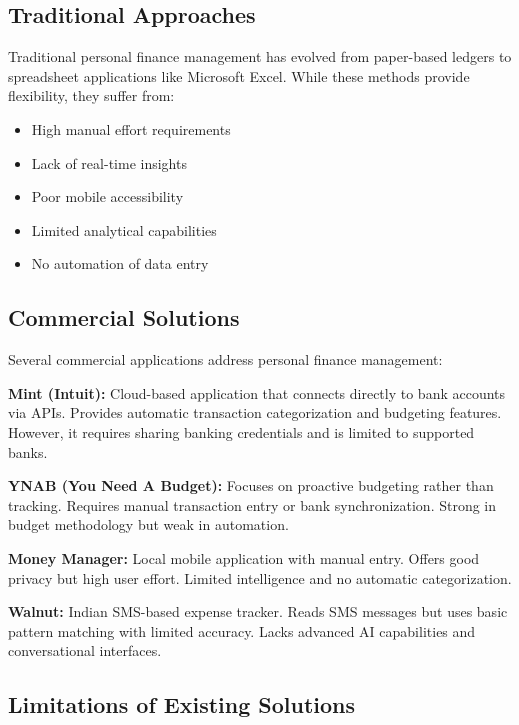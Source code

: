 \documentclass[11pt,a4paper]{report}
\begin{document}
\subsection{Traditional Approaches}

Traditional personal finance management has evolved from paper-based ledgers to spreadsheet applications like Microsoft Excel. While these methods provide flexibility, they suffer from:

\begin{itemize}
    \item High manual effort requirements
    \item Lack of real-time insights
    \item Poor mobile accessibility
    \item Limited analytical capabilities
    \item No automation of data entry
\end{itemize}

\subsection{Commercial Solutions}

Several commercial applications address personal finance management:

\textbf{Mint (Intuit):} Cloud-based application that connects directly to bank accounts via APIs. Provides automatic transaction categorization and budgeting features. However, it requires sharing banking credentials and is limited to supported banks.

\textbf{YNAB (You Need A Budget):} Focuses on proactive budgeting rather than tracking. Requires manual transaction entry or bank synchronization. Strong in budget methodology but weak in automation.

\textbf{Money Manager:} Local mobile application with manual entry. Offers good privacy but high user effort. Limited intelligence and no automatic categorization.

\textbf{Walnut:} Indian SMS-based expense tracker. Reads SMS messages but uses basic pattern matching with limited accuracy. Lacks advanced AI capabilities and conversational interfaces.

\subsection{Limitations of Existing Solutions}
\end{document}
